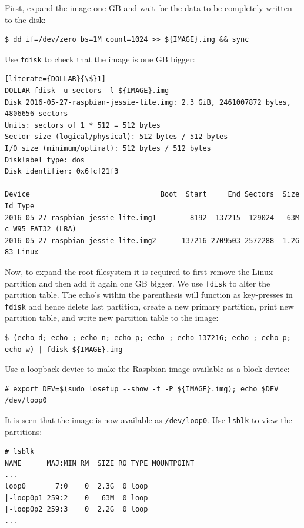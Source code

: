 First, expand the image one \ac{GB} and wait for the data to be completely written
to the disk:
\begin{lstlisting}[]
$ dd if=/dev/zero bs=1M count=1024 >> ${IMAGE}.img && sync
\end{lstlisting}
\FloatBarrier
\vspace{-5mm}

Use \texttt{fdisk} to check that the image is one \ac{GB} bigger:
\begin{lstlisting}[literate={DOLLAR}{\$}1]
DOLLAR fdisk -u sectors -l ${IMAGE}.img
Disk 2016-05-27-raspbian-jessie-lite.img: 2.3 GiB, 2461007872 bytes, 4806656 sectors
Units: sectors of 1 * 512 = 512 bytes
Sector size (logical/physical): 512 bytes / 512 bytes
I/O size (minimum/optimal): 512 bytes / 512 bytes
Disklabel type: dos
Disk identifier: 0x6fcf21f3

Device                               Boot  Start     End Sectors  Size Id Type
2016-05-27-raspbian-jessie-lite.img1        8192  137215  129024   63M  c W95 FAT32 (LBA)
2016-05-27-raspbian-jessie-lite.img2      137216 2709503 2572288  1.2G 83 Linux
\end{lstlisting}
\FloatBarrier
\vspace{-5mm}

Now, to expand the root filesystem it is required to first remove the Linux partition
and then add it again one \ac{GB} bigger.
We use \texttt{fdisk} to alter the partition table. The echo's within the parenthesis
will function as
key-presses in \texttt{fdisk} and hence delete last partition, create a new
primary partition, print new partition table, and write new partition table
to the image:

\begin{lstlisting}[]
$ (echo d; echo ; echo n; echo p; echo ; echo 137216; echo ; echo p; echo w) | fdisk ${IMAGE}.img
\end{lstlisting}
\FloatBarrier
\vspace{-5mm}

Use a loopback device to make the Raspbian image available as a block device: 
\begin{lstlisting}[]
# export DEV=$(sudo losetup --show -f -P ${IMAGE}.img); echo $DEV
/dev/loop0
\end{lstlisting}
\FloatBarrier
\vspace{-5mm}

It is seen that the image is now available as \texttt{/dev/loop0}. Use \texttt{lsblk}
to view the partitions:

\begin{lstlisting}[]
# lsblk
NAME      MAJ:MIN RM  SIZE RO TYPE MOUNTPOINT
...
loop0       7:0    0  2.3G  0 loop 
|-loop0p1 259:2    0   63M  0 loop 
|-loop0p2 259:3    0  2.2G  0 loop
...
\end{lstlisting}
\FloatBarrier
\vspace{-5mm}

